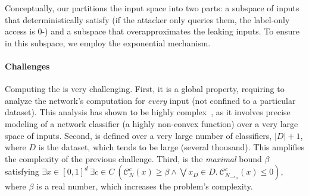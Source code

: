 Conceptually, our \propa %
partitions the input space into two parts: a subspace of inputs that deterministically satisfy \propi (if the attacker only queries them, the label-only access is $0$-\propi) and a subspace 
that overapproximates the leaking inputs. %
To ensure \propi in this subspace, we employ the exponential mechanism.
\sloppy
\paragraph{Challenges} Computing the \propa is very challenging. First, it is a global property, requiring to analyze the network's computation for \emph{every} input (not confined to a particular dataset). 
This analysis has shown to be highly complex~\citep{ref_51,ref_52}, as it involves precise modeling of a network classifier (a highly non-convex function) over a very large space of inputs. 
Second, \propa is defined over a very large number of classifiers, $|D|+1$, where $D$ is the dataset, which tends to be large (several thousand). This amplifies the complexity of the previous challenge. %
Third, \propa is the \emph{maximal} bound $\beta$ satisfying 
$\exists x \in [0,1]^d\ \exists c\in C \ \left( 
\mathcal{C}_{N}^c(x) \geq \beta \land \bigvee x_D \in D.\ \mathcal{C}_{N_{-x_D}}^c(x) \leq 0\right )$, where $\beta$ is a real number, which 
increases the problem's complexity. %


  
  
  
  









